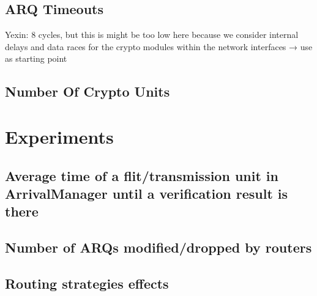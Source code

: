 \subsection{ARQ Timeouts}
Yexin: 8 cycles, but this is might be too low here because we consider internal delays and data races for the crypto modules within the network
interfaces → use as starting point

\subsection{Number Of Crypto Units}

\section{Experiments}
\subsection{Average time of a flit/transmission unit in ArrivalManager until a verification result is there}
\subsection{Number of ARQs modified/dropped by routers}
\subsection{Routing strategies effects}

\iffalse
Experiment setup parameter tables:
- NC mode (UC, G2C3, G2C4)
- ...

ARQ Limit: 1, at most 2 because more ARQs allowed per transmission unit means larger retransmission buffers everywhere
\fi
